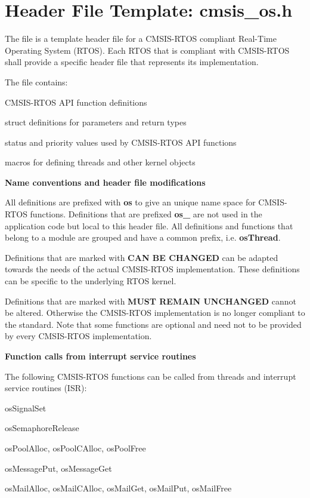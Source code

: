 \chapter{Header File Template\+: cmsis\+\_\+os.\+h}
\hypertarget{cmsis_os_h}{}\label{cmsis_os_h}
The file {\bfseries{}} is a template header file for a CMSIS-\/\+RTOS compliant Real-\/\+Time Operating System (RTOS). Each RTOS that is compliant with CMSIS-\/\+RTOS shall provide a specific {\bfseries{}} header file that represents its implementation.

The file  contains\+:
\begin{DoxyItemize}
\item CMSIS-\/\+RTOS API function definitions
\item struct definitions for parameters and return types
\item status and priority values used by CMSIS-\/\+RTOS API functions
\item macros for defining threads and other kernel objects
\end{DoxyItemize}

{\bfseries{Name conventions and header file modifications}}

All definitions are prefixed with {\bfseries{os}} to give an unique name space for CMSIS-\/\+RTOS functions. Definitions that are prefixed {\bfseries{os\+\_\+}} are not used in the application code but local to this header file. All definitions and functions that belong to a module are grouped and have a common prefix, i.\+e. {\bfseries{os\+Thread}}.

Definitions that are marked with {\bfseries{CAN BE CHANGED}} can be adapted towards the needs of the actual CMSIS-\/\+RTOS implementation. These definitions can be specific to the underlying RTOS kernel.

Definitions that are marked with {\bfseries{MUST REMAIN UNCHANGED}} cannot be altered. Otherwise the CMSIS-\/\+RTOS implementation is no longer compliant to the standard. Note that some functions are optional and need not to be provided by every CMSIS-\/\+RTOS implementation.

{\bfseries{Function calls from interrupt service routines}}

The following CMSIS-\/\+RTOS functions can be called from threads and interrupt service routines (ISR)\+:
\begin{DoxyItemize}
\item os\+Signal\+Set
\item os\+Semaphore\+Release
\item os\+Pool\+Alloc, os\+Pool\+CAlloc, os\+Pool\+Free
\item os\+Message\+Put, os\+Message\+Get
\item os\+Mail\+Alloc, os\+Mail\+CAlloc, os\+Mail\+Get, os\+Mail\+Put, os\+Mail\+Free
\end{DoxyItemize}

